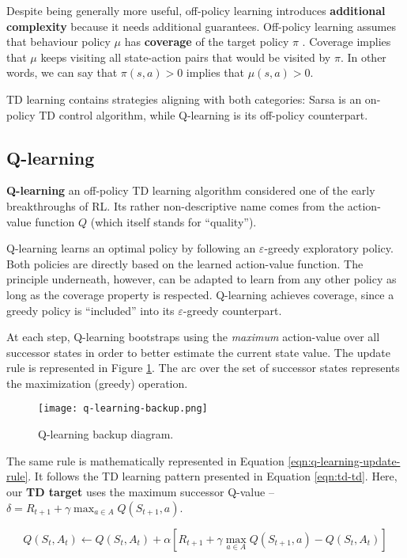Despite being generally more useful, off-policy learning introduces \textbf{additional complexity} because it needs additional guarantees.
Off-policy learning assumes that behaviour policy $\mu$ has \textbf{coverage} of the target policy $\pi$ \cite{rlai}.
Coverage implies that $\mu$ keeps visiting all state-action pairs that would be visited by $\pi$.
In other words, we can say that $\pi(s, a) > 0$ implies that $\mu(s, a) > 0$.


TD learning contains strategies aligning with both categories: Sarsa is an on-policy TD control algorithm, while Q-learning is its off-policy counterpart.

\subsection{Q-learning} \label{rl:q-learning}
\textbf{Q-learning} \cite{Watkins1992} an off-policy TD learning algorithm considered one of the early breakthroughs of RL.
Its rather non-descriptive name comes from the action-value function $Q$ (which itself stands for ``quality'').


Q-learning learns an optimal policy by following an $\varepsilon$-greedy exploratory policy.
Both policies are directly based on the learned action-value function.
The principle underneath, however, can be adapted to learn from any other policy as long as the coverage property is respected.
Q-learning achieves coverage, since a greedy policy is ``included'' into its $\varepsilon$-greedy counterpart.

At each step, Q-learning bootstraps using the \emph{maximum} action-value over all successor states in order to better estimate the current state value.
The update rule is represented in Figure \ref{fig:q-learning-backup}.
The arc over the set of successor states represents the maximization (greedy) operation.

\begin{figure}[h]
    \centering
    \texttt{[image: q-learning-backup.png]}
    \caption{Q-learning backup diagram.}
    \label{fig:q-learning-backup}
\end{figure}

The same rule is mathematically represented in Equation \ref{eqn:q-learning-update-rule}.
It follows the TD learning pattern presented in Equation \ref{eqn:td-td}. Here, our \textbf{TD target} uses the maximum successor Q-value -- $\delta = R_{t+1} + \gamma \max_{a \in A}{Q(S_{t+1}, a)}$.


\begin{equation} \label{eqn:q-learning-update-rule}
    Q(S_t, A_t) \leftarrow Q(S_t, A_t) + \alpha [
        R_{t+1} + \gamma \max_{a \in A}{Q(S_{t+1}, a)} - Q(S_t, A_t)
    ]
\end{equation}
 
\clearpage